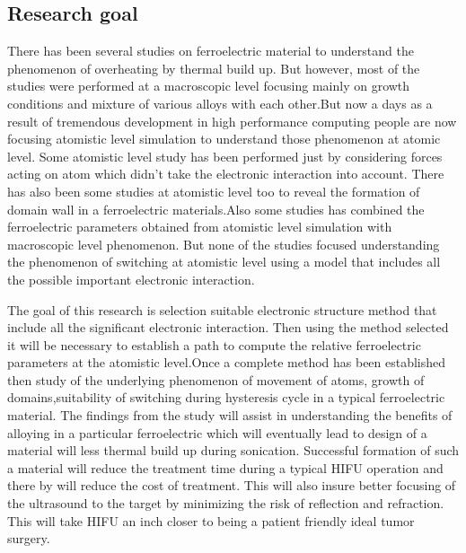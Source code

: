 \subsection{Research goal}
There has been several studies on ferroelectric material to understand the phenomenon of overheating by thermal build up. But however, most of the studies were performed at a macroscopic level focusing mainly on growth conditions and mixture of various alloys with each other.But now a days as a result of tremendous development in high performance computing people are now focusing atomistic level simulation to understand those phenomenon at atomic level. Some atomistic level study has been performed just by considering forces acting on atom which didn't take the  electronic interaction  into account. There has also been some studies at atomistic level too to reveal the formation of domain wall in a ferroelectric materials.Also some studies has combined the ferroelectric parameters obtained from atomistic level simulation with macroscopic level phenomenon. But none of the studies focused understanding the phenomenon of switching at atomistic level using a model that includes all the possible important electronic interaction.

The goal of this research is selection suitable electronic structure method that include all the significant electronic interaction. Then using the method selected it will be necessary to establish a path to compute the relative ferroelectric parameters at the atomistic level.Once a complete method has been established then study of the underlying phenomenon of movement of atoms, growth of domains,suitability of switching during hysteresis cycle in a typical ferroelectric material. The findings from the study will assist in understanding the benefits of alloying in a particular ferroelectric which will eventually lead to design of a material will less thermal build up during sonication. Successful formation of such a material will reduce the treatment time during a typical HIFU operation and there by will reduce the cost of treatment. This will also insure better focusing of the ultrasound to the target by minimizing the risk of reflection and refraction. This will take HIFU  an inch closer to being a patient friendly ideal tumor surgery.  